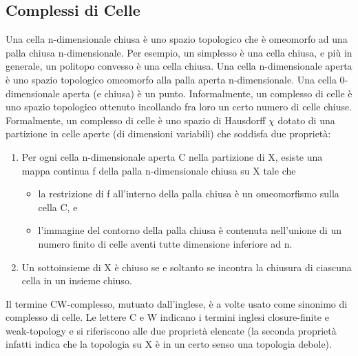 \documentclass[a4paper]{extreport}
\begin{document}
\begin{multicols*}{2}
\section{Complessi di Celle}
Una cella n-dimensionale chiusa è uno spazio topologico che è omeomorfo ad una palla chiusa n-dimensionale. Per esempio, un simplesso è una cella chiusa, e più in generale, un politopo convesso è una cella chiusa. Una cella n-dimensionale aperta è uno spazio topologico omeomorfo alla palla aperta n-dimensionale. Una cella 0-dimensionale aperta (e chiusa) è un punto.
Informalmente, un complesso di celle è uno spazio topologico ottenuto incollando fra loro un certo numero di celle chiuse. Formalmente, un complesso di celle è uno spazio di Hausdorff \textbf{$\chi$} dotato di una partizione in celle aperte (di dimensioni variabili) che soddisfa due proprietà:\begin{enumerate}
    \item Per ogni cella n-dimensionale aperta C nella partizione di X, esiste una mappa continua f della palla n-dimensionale chiusa su X tale che\begin{itemize}
        \item la restrizione di f all'interno della palla chiusa è un omeomorfismo sulla cella C, e
        \item l'immagine del contorno della palla chiusa è contenuta nell'unione di un numero finito di celle aventi tutte dimensione inferiore ad n.
    \end{itemize}
    \item Un sottoinsieme di X è chiuso se e soltanto se incontra la chiusura di ciascuna cella in un insieme chiuso.
\end{enumerate}
Il termine CW-complesso, mutuato dall'inglese, è a volte usato come sinonimo di complesso di celle. Le lettere C e W indicano i termini inglesi closure-finite e weak-topology e si riferiscono alle due proprietà elencate (la seconda proprietà infatti indica che la topologia su X è in un certo senso una topologia debole).
\end{multicols*}
\end{document}
